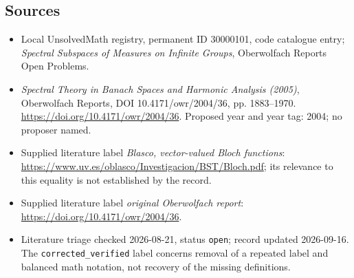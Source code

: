 \documentclass[11pt]{article}
\begin{document}
\subsection{Sources}
\begin{itemize}\item Local UnsolvedMath registry, permanent ID 30000101, code catalogue entry; \emph{Spectral Subspaces of Measures on Infinite Groups}, Oberwolfach Reports Open Problems.\item \emph{Spectral Theory in Banach Spaces and Harmonic Analysis (2005)}, Oberwolfach Reports, DOI 10.4171/owr/2004/36, pp. 1883--1970. \url{https://doi.org/10.4171/owr/2004/36}. Proposed year and year tag: 2004; no proposer named.\item Supplied literature label \emph{Blasco, vector-valued Bloch functions}: \url{https://www.uv.es/oblasco/Investigacion/BST/Bloch.pdf}; its relevance to this equality is not established by the record.\item Supplied literature label \emph{original Oberwolfach report}: \url{https://doi.org/10.4171/owr/2004/36}.\item Literature triage checked 2026-08-21, status \texttt{open}; record updated 2026-09-16. The \texttt{corrected\_verified} label concerns removal of a repeated label and balanced math notation, not recovery of the missing definitions.\end{itemize}
\end{document}
